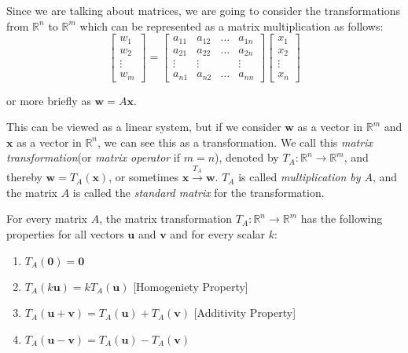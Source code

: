 \documentclass{report}
\begin{document}
		Since we are talking about matrices, we are going to consider the transformations from $\mathbb{R}^n$ to $\mathbb{R}^m$ which can be represented as a matrix multiplication as follows:
		\begin{displaymath}
			\begin{bmatrix}
				w_1 \\ w_2 \\ \vdots \\ w_m
			\end{bmatrix}
			=
			\begin{bmatrix}
				a_{11} & a_{12} & \dots & a_{1n} \\
				a_{21} & a_{22} & \dots & a_{2n} \\
				\vdots & \vdots &       & \vdots \\
				a_{n1} & a_{n2} & \dots & a_{nn}
			\end{bmatrix}
			\begin{bmatrix}
				x_1 \\ x_2 \\ \vdots \\ x_n
			\end{bmatrix}
		\end{displaymath}
		
		or more briefly as $\bm{w}=A\bm{x}$.
		
		This can be viewed as a linear system, but if we consider $\bm{w}$ as a vector in $\mathbb{R}^m$ and $\bm{x}$ as a vector in $\mathbb{R}^n$, we can see this as a transformation. We call this \emph{matrix transformation}(or \emph{matrix operator} if $m=n$), denoted by $T_A:\mathbb{R}^n\rightarrow \mathbb{R}^m$, and thereby $\bm{w}=T_A(\bm{x})$, or sometimes $\bm{x} \xrightarrow{T_A} \bm{w}$. $T_A$ is called \emph{multiplication by $A$}, and the matrix $A$ is called the \emph{standard matrix} for the transformation.
		
		\begin{thm}
			For every matrix $A$, the matrix transformation $T_A:\mathbb{R}^n \rightarrow \mathbb{R}^m$ has the following properties for all vectors $\bm{u}$ and $\bm{v}$ and for every scalar $k$:
			\begin{enumerate}
				\item $T_A(\bm{0})=\bm{0}$
				\item $T_A(k\bm{u})=kT_A(\bm{u})$ [Homogeniety Property]
				\item $T_A(\bm{u}+\bm{v})=T_A(\bm{u})+T_A(\bm{v})$ [Additivity Property]
				\item $T_A(\bm{u}-\bm{v})=T_A(\bm{u})-T_A(\bm{v})$
			\end{enumerate}
		\end{thm}
		
\end{document}
